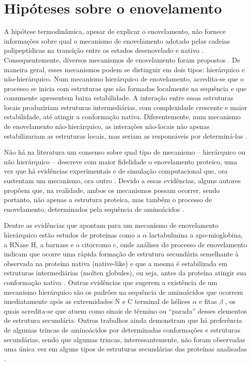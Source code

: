 \section{Hipóteses sobre o enovelamento}

A hipótese termodinâmica, apesar de explicar o enovelamento, não fornece informações sobre qual o mecanismo de enovelamento adotado pelas cadeias polipeptídicas na transição entre os estados desenovelado e nativo \cite{Rose:2001}. Consequentemente, diversos mecanismos de enovelamento foram propostos \cite{DilleChan:1997, Dill:2008; DilleMaccallum:2012}. De maneira geral, esses mecanismos podem se distinguir em dois tipos: hierárquico e não-hierárquico. Num mecanismo hierárquico de enovelamento, acredita-se que o processo se inicia com estruturas que são formadas localmente na sequência e que comumente apresentem baixa estabilidade. A interação entre essas estruturas locais produziriam estruturas intermediárias, com complexidade crescente e maior estabilidade, até atingir a conformação nativa. Diferentemente, num mecanismo de enovelamento não-hierárquico, as interações não-locais não apenas estabilizariam as estruturas locais, mas seriam as responsáveis por determiná-las \cite{BaldwineRose:1999}.


Não há na literatura um consenso sobre qual tipo de mecanismo -- hierárquico ou não hierárquico -- descreve com maior fidelidade o enovelamento proteico, uma vez que há evidências experimentais e de simulação computacional que, ora sustentam um mecanismo, ora outro \cite{BaldwineRose:1999, DaggeteFersht:2003}. Devido a essas evidências, alguns autores propõem que, na realidade, ambos os mecanismos possam ocorrer, sendo portanto, não apenas a estrutura proteica, mas também o processo de enovelamento, determinados pela sequência de aminoácidos \cite{DaggetteFersht:2003}.

Dentre as evidências que apontam para um mecanismo de enovelamento hierárquico estão estudos de proteínas como a $\alpha$ lactabulmina a apo-mioglobina, a RNase H, a barnase e o citocromo c, onde análises do processo de enovelamento indicam que ocorre uma rápida formação de estrutura secundária semelhante à observada na proteína nativa (native-like) e que a mesma é estabilizada em estruturas intermediárias (molten globules), ou seja, antes da proteína atingir sua conformação nativa \cite{BaldwineRose:1999a}. Outras evidências que sugerem a existência de um mecanismo hierárquico são os padrões na sequência de aminoácidos que ocorrem imediatamente após as extremidades N e C terminal de hélices $\alpha$ \cite{HarpereRose:1993, AuroraSrinivasaneRose:1994, Aurora:1997, BaldwineRose:1999a} e fitas $\beta$ \cite{ColloceCohen:1991}, os quais acredita-se que atuem como sinais de término ou “parada” desses elementos de estrutura secundária. Outros trabalhos ainda demonstram que há preferência de algumas trincas de aminoácidos por determinadas conformações e estruturas secundárias\cite{BetancourteSkolnick:2004,Otaki:2010}, sendo que algumas trincas, interessantemente, não foram observadas uma única vez em alguns tipos de estruturas secundárias das proteínas analisadas \cite{Otaki:2010}.

